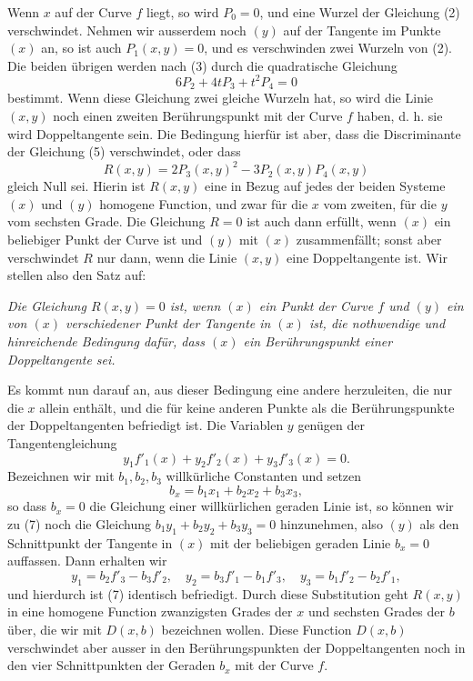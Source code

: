 \documentclass[11pt]{article}
\begin{document}
Wenn \(x\) auf der Curve \(f\) liegt, so wird \(P_0=0\), und eine Wurzel der Gleichung (2) verschwindet. Nehmen wir ausserdem noch \((y)\) auf der Tangente im Punkte \((x)\) an, so ist auch \(P_1(x,y)=0\), und es verschwinden zwei Wurzeln von (2). Die beiden übrigen werden nach (3) durch die quadratische Gleichung
\begin{equation}
 6P_2+4tP_3+t^2P_4=0
 \tag{5}
\end{equation}
bestimmt. Wenn diese Gleichung zwei gleiche Wurzeln hat, so wird die Linie \((x,y)\) noch einen zweiten Berührungspunkt mit der Curve \(f\) haben, d. h. sie wird Doppeltangente sein. Die Bedingung hierfür ist aber, dass die Discriminante der Gleichung (5) verschwindet, oder dass
\begin{equation}
 R(x,y)=2P_3(x,y)^2-3P_2(x,y)P_4(x,y)
 \tag{6}
\end{equation}
gleich Null sei. Hierin ist \(R(x,y)\) eine in Bezug auf jedes der beiden Systeme \((x)\) und \((y)\) homogene Function, und zwar für die \(x\) vom zweiten, für die \(y\) vom sechsten Grade. Die Gleichung \(R=0\) ist auch dann erfüllt, wenn \((x)\) ein beliebiger Punkt der Curve ist und \((y)\) mit \((x)\) zusammenfällt; sonst aber verschwindet \(R\) nur dann, wenn die Linie \((x,y)\) eine Doppeltangente ist. Wir stellen also den Satz auf:

\emph{Die Gleichung \(R(x,y)=0\) ist, wenn \((x)\) ein Punkt der Curve \(f\) und \((y)\) ein von \((x)\) verschiedener Punkt der Tangente in \((x)\) ist, die nothwendige und hinreichende Bedingung dafür, dass \((x)\) ein Berührungspunkt einer Doppeltangente sei.}

Es kommt nun darauf an, aus dieser Bedingung eine andere herzuleiten, die nur die \(x\) allein enthält, und die für keine anderen Punkte als die Berührungspunkte der Doppeltangenten befriedigt ist. Die Variablen \(y\) genügen der Tangentengleichung
\begin{equation}
 y_1f'_1(x)+y_2f'_2(x)+y_3f'_3(x)=0.
 \tag{7}
\end{equation}
Bezeichnen wir mit \(b_1,b_2,b_3\) willkürliche Constanten und setzen
\begin{equation}
 b_x=b_1x_1+b_2x_2+b_3x_3,
 \tag{8}
\end{equation}
so dass \(b_x=0\) die Gleichung einer willkürlichen geraden Linie ist, so können wir zu (7) noch die Gleichung \(b_1y_1+b_2y_2+b_3y_3=0\) hinzunehmen, also \((y)\) als den Schnittpunkt der Tangente in \((x)\) mit der beliebigen geraden Linie \(b_x=0\) auffassen. Dann erhalten wir
\begin{equation}
 y_1=b_2f'_3-b_3f'_2,
 \quad y_2=b_3f'_1-b_1f'_3,
 \quad y_3=b_1f'_2-b_2f'_1,
 \tag{10}
\end{equation}
und hierdurch ist (7) identisch befriedigt. Durch diese Substitution geht \(R(x,y)\) in eine homogene Function zwanzigsten Grades der \(x\) und sechsten Grades der \(b\) über, die wir mit \(D(x,b)\) bezeichnen wollen. Diese Function \(D(x,b)\) verschwindet aber ausser in den Berührungspunkten der Doppeltangenten noch in den vier Schnittpunkten der Geraden \(b_x\) mit der Curve \(f\).
\end{document}
